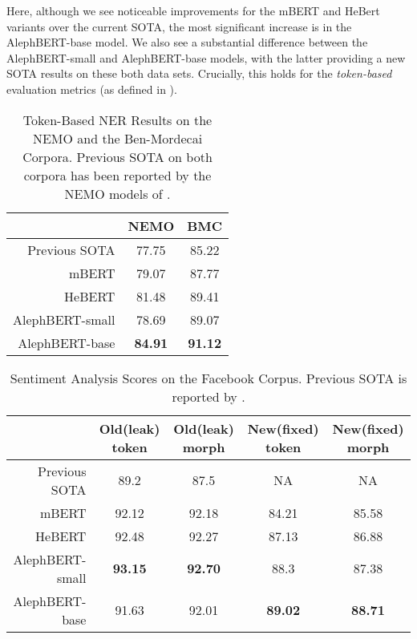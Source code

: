 \documentclass[11pt,a4paper]{article}
\begin{document}
Here, although we see noticeable improvements for the mBERT and HeBert variants over the current SOTA, the most significant increase is in the AlephBERT-base model. We also see a substantial difference between the AlephBERT-small and AlephBERT-base models, with the latter providing a new SOTA results on these both data sets. Crucially, this holds for the {\em token-based} evaluation metrics  (as defined in \citet{nemo}).
\begin{table}[t]

\begin{tabular}{|r||cc|}
\hline
       & NEMO  & BMC
   \\\hline   \hline
  Previous SOTA     & 77.75   &  85.22  \\
\hline
  mBERT  & 79.07  & 87.77 \\
  HeBERT &  81.48  &  89.41 \\
    \hline
  AlephBERT-small &  78.69  &  89.07 \\
    AlephBERT-base & \textbf{84.91}   & \textbf{91.12} \\
  \hline
\end{tabular}
\caption{
Token-Based NER Results on the NEMO and the Ben-Mordecai Corpora. Previous SOTA on both corpora has been reported by the NEMO models of \citet{nemo}. }\label{ner-results}
\end{table}
 




 \begin{table*}
\begin{tabular}{|r||cc|cc|}
\hline
    &  Old(leak) token & Old(leak) morph & New(fixed) token & New(fixed) morph
   \\\hline   \hline
  Previous SOTA   & 89.2 & 87.5 &NA & NA\\
  \hline
  mBERT & 92.12 & 92.18 & 84.21 & 85.58 \\
  HeBERT & 92.48 & 92.27 & 87.13 & 86.88 \\
    \hline
  AlephBERT-small & \textbf{93.15} & \textbf{92.70} & 88.3 & 87.38 \\
    AlephBERT-base& 91.63 & 92.01  & \textbf{89.02} & \textbf{88.71}\\
  \hline
\end{tabular}
\caption{Sentiment Analysis Scores on the Facebook Corpus. Previous SOTA is  reported by \citet{amram2018}.}
\label{sentiment-results}
\end{table*}
\end{document}
